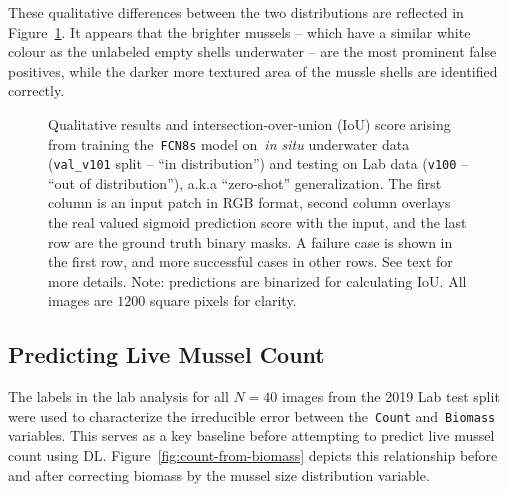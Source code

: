 \documentclass[11pt]{article} %
\begin{document}
These qualitative differences between the two distributions are 
reflected in Figure~\ref{fig:zero-shot-situ-lab}. It appears that the brighter 
mussels -- which have a similar white colour as the unlabeled empty shells
underwater -- are the most prominent false positives, while the darker more 
textured area of the mussle shells are identified correctly.

\newcommand{\zshot}{./img/situ_to_lab/}

\begin{figure}
\centering
{}

\caption{Qualitative results and intersection-over-union (IoU) score arising
from training the~\texttt{FCN8s} model on~\emph{in situ} underwater data
(\texttt{val\_v101} split -- ``in distribution'') and testing on Lab data 
(\texttt{v100} -- ``out of distribution''), a.k.a ``zero-shot'' generalization. 
The first column is an input patch in RGB format, second column 
overlays the real valued sigmoid prediction score with the input, and the last 
row are the ground truth binary masks. A failure case is shown in the first
row, and more successful cases in other rows. See text for more details. 
Note: predictions are binarized for calculating IoU. All images are $1200$
square pixels for clarity.}
\label{fig:zero-shot-situ-lab}
\end{figure}


\subsection{Predicting Live Mussel Count}

The labels in the lab analysis for all $N=40$ images from the 2019 Lab test 
split were used to characterize the irreducible error between 
the~\texttt{Count} and~\texttt{Biomass} variables. This serves as a key
baseline before attempting to predict live mussel count using DL. 
Figure~\ref{fig:count-from-biomass} depicts this relationship before and after 
correcting biomass by the mussel size distribution variable. 
\end{document}
